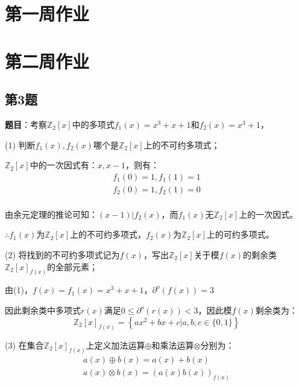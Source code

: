 \chapter{第一周作业}

\newpage
\chapter{第二周作业}

\section{第3题}

\textbf{题目}：考察$\mathbb{Z}_2[x]$中的多项式$f_1(x)=x^3+x+1$和$f_2(x)=x^3+1$，


(1) 判断$f_1(x),f_2(x)$哪个是$\mathbb{Z}_2[x]$上的不可约多项式；

\begin{Solution}
    $\mathbb{Z}_2[x]$中的一次因式有：$x,x-1$，则有：
    \begin{equation}
        \begin{aligned}
            f_1(0) = 1, f_1(1) = 1\\
            f_2(0) = 1, f_2(1) = 0\\
        \end{aligned}
    \end{equation}
    
    由余元定理的推论可知：$(x-1)|f_2(x)$，而$f_1(x)$无$\mathbb{Z}_2[x]$上的一次因式。
    
    $\therefore f_1(x)$为$\mathbb{Z}_2[x]$上的不可约多项式，$f_2(x)$为$\mathbb{Z}_2[x]$上的可约多项式。
\end{Solution}

(2) 将找到的不可约多项式记为$f(x)$，写出$\mathbb{Z}_2[x]$关于模$f(x)$的剩余类$\mathbb{Z}_2[x]_{f(x)}$的全部元素；

\begin{Solution}
    由(1)，$f(x)=f_1(x)=x^3+x+1$，$\partial^o(f(x))=3$
    
    因此剩余类中多项式$r(x)$满足$0\le \partial^o(r(x)) < 3$，因此模$f(x)$剩余类为：
    \begin{equation}
        \mathbb{Z}_2[x]_{f(x)} = \left\{ax^2+bx+c|a,b,c \in \{0,1\}\right\}
    \end{equation}
\end{Solution}

(3) 在集合$\mathbb{Z}_2[x]_{f(x)}$上定义加法运算$\oplus$和乘法运算$\otimes$分别为：
\begin{equation}
    \begin{aligned}
        a(x) \oplus b(x) = a(x) + b(x) \\
        a(x) \otimes b(x) = (a(x)b(x))_{f(x)}
    \end{aligned}
\end{equation}

